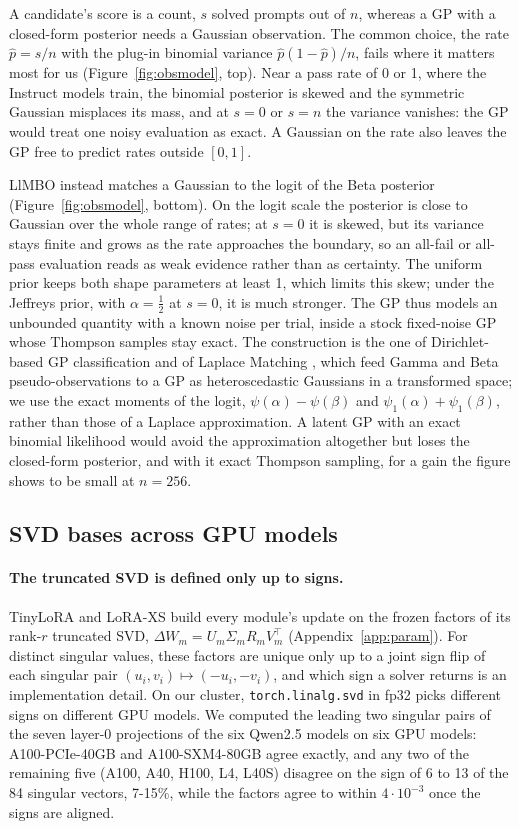 \documentclass[twoside]{article}
\newcommand{\llmbo}{LlMBO}
\begin{document}
A candidate's score is a count, $s$ solved prompts out of $n$, whereas a GP with a closed-form posterior needs a Gaussian observation. The common choice, the rate $\hat p = s/n$ with the plug-in binomial variance $\hat p(1 - \hat p)/n$, fails where it matters most for us (Figure~\ref{fig:obsmodel}, top). Near a pass rate of 0 or 1, where the Instruct models train, the binomial posterior is skewed and the symmetric Gaussian misplaces its mass, and at $s = 0$ or $s = n$ the variance vanishes: the GP would treat one noisy evaluation as exact. A Gaussian on the rate also leaves the GP free to predict rates outside $[0, 1]$.

\llmbo{} instead matches a Gaussian to the logit of the Beta posterior (Figure~\ref{fig:obsmodel}, bottom). On the logit scale the posterior is close to Gaussian over the whole range of rates; at $s = 0$ it is skewed, but its variance stays finite and grows as the rate approaches the boundary, so an all-fail or all-pass evaluation reads as weak evidence rather than as certainty. The uniform prior keeps both shape parameters at least 1, which limits this skew; under the Jeffreys prior, with $\alpha = \frac12$ at $s = 0$, it is much stronger. The GP thus models an unbounded quantity with a known noise per trial, inside a stock fixed-noise GP whose Thompson samples stay exact. The construction is the one of Dirichlet-based GP classification \citep{milios2018dirichlet} and of Laplace Matching \citep{hobbhahn2021laplace}, which feed Gamma and Beta pseudo-observations to a GP as heteroscedastic Gaussians in a transformed space; we use the exact moments of the logit, $\psi(\alpha) - \psi(\beta)$ and $\psi_1(\alpha) + \psi_1(\beta)$, rather than those of a Laplace approximation. A latent GP with an exact binomial likelihood would avoid the approximation altogether but loses the closed-form posterior, and with it exact Thompson sampling, for a gain the figure shows to be small at $n = 256$.

\subsection{SVD bases across GPU models}
\label{app:svd-signs}

\paragraph{The truncated SVD is defined only up to signs.}
TinyLoRA and LoRA-XS build every module's update on the frozen factors of its rank-$r$ truncated SVD, $\Delta W_m = U_m \Sigma_m R_m V_m^\top$ (Appendix~\ref{app:param}). For distinct singular values, these factors are unique only up to a joint sign flip of each singular pair $(u_i, v_i) \mapsto (-u_i, -v_i)$, and which sign a solver returns is an implementation detail. On our cluster, \texttt{torch.linalg.svd} in fp32 picks different signs on different GPU models. We computed the leading two singular pairs of the seven layer-0 projections of the six Qwen2.5 models on six GPU models: A100-PCIe-40GB and A100-SXM4-80GB agree exactly, and any two of the remaining five (A100, A40, H100, L4, L40S) disagree on the sign of 6 to 13 of the 84 singular vectors, 7-15\%, while the factors agree to within $4 \cdot 10^{-3}$ once the signs are aligned.
\end{document}

